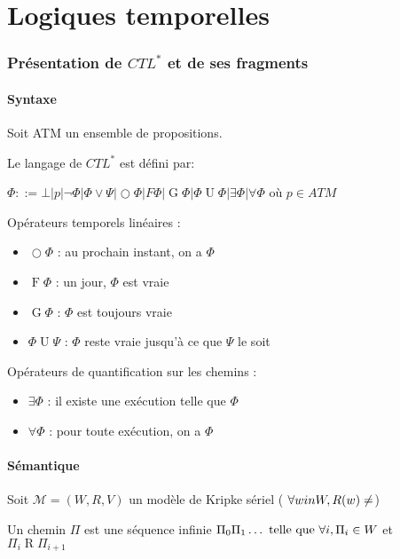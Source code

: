 \documentclass[10pt,a4paper]{article}
\newcommand{\M}{\mathcal{M}}
\DeclareMathOperator{\Ro}{R}
\DeclareMathOperator{\Oo}{\bigcirc}
\DeclareMathOperator{\Fo}{F}
\DeclareMathOperator{\Go}{G}
\DeclareMathOperator{\Uo}{U}
\begin{document}
\part{Logiques temporelles}

\section{Présentation de $CTL^*$ et de ses fragments}
\subsection{Syntaxe}

Soit ATM un ensemble de propositions.

Le langage de $CTL^*$ est défini par:

$\Phi ::= \bot  |  p  |  \lnot \Phi  |  \Phi \vee \Psi  |   \Oo \Phi  |  F \Phi  |  \Go \Phi  |  \Phi \Uo \Phi  |  \exists \Phi  |  \forall \Phi$ où $p \in ATM$

Opérateurs temporels linéaires :
\begin{itemize}
 \item $ \Oo \Phi$ : au prochain instant, on a $\Phi$
 \item  $\Fo \Phi$ : un jour, $\Phi$ est vraie
 \item $\Go \Phi$ : $\Phi$ est toujours vraie
 \item $\Phi \Uo \Psi$ : $\Phi$ reste vraie jusqu'à ce que $\Psi$ le soit
\end{itemize}

Opérateurs de quantification sur les chemins : 
\begin{itemize}
 \item $\exists \Phi$ : il existe une exécution telle que $\Phi$
 \item $\forall \Phi$ : pour toute exécution, on a $\Phi$
\end{itemize}

\subsection{Sémantique}
Soit $\M = (W,R,V)$ un modèle de Kripke sériel ( $\forall w in W, R(w) \not = \empty$)

Un chemin $\Pi$ est une séquence infinie $\Pi_0 \Pi_1 \dots \tq[le] \forall i, \Pi_i \in W$ et $\Pi_i   \Ro \Pi_{i+1}$
\end{document}
